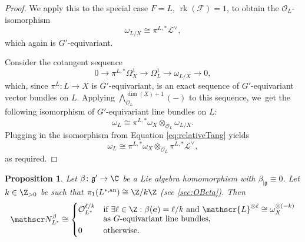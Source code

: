 \documentclass[JEP,XML,SOM,Unicode,published]{cedram}
\newcommand{\bme}{{\boldsymbol{e}}}
\newtheorem{prop}[thm]{Proposition}
\newcommand{\Ell}{\mathscr{L}}
\newcommand{\cO}{\mathcal{O}}\let\O\cO
\newcommand{\frg}{\mathfrak{g}}
\DeclareMathOperator{\rk}{rk}
\newcommand\restr[2]{{#1_{| {#2}}}}
\begin{document}
\begin{proof}
We apply this to the special case $F=L$, \ie $\rk(\mathscr{F})=1$, to obtain the $\cO_L$\nobreakdash-isomorphism
\begin{equation}\label{eq:relativeTang}
\omega_{L/X}\cong \pi^{L,*}\Ell^\vee,
\end{equation}which again is $G'$-equivariant.

Consider the cotangent sequence
\[
0 \to \pi^{L,*} \Omega^1_X \to \Omega^1_L
\to \omega_{L/X}\to 0,
\]
which, since $\pi^L \colon L\to X$ is $G'$-equivariant, is an exact sequence of $G'$-equivariant vector bundles on $L$. Applying $\bigwedge^{\dim(X)+1}_{\cO_L}(-)$ to this sequence, we~get the following isomorphism of $G'$-equivariant line bundles on $L$:
\[
\omega_L \cong \pi^{L,*}\omega_X \otimes_{\cO_L} \omega_{L/X}.
\]
Plugging in the isomorphism from Equation \eqref{eq:relativeTang} yields
\[
\omega_L \cong \pi^{L,*} \omega_X \otimes_{\O_L} \pi^{L,*} \Ell^\vee,
\]
as required.
\end{proof}

\begin{prop} \label{prop:NBetaEqualsOBeta}
Let
$\beta \colon \frg' \to \C$ be a Lie algebra homomorphism with $\restr{\beta}{\frg} \equiv 0$. Let $k \in \Z_{>0}$ be such that $\pi_1(L^{*,\mathrm{an}}) \cong \Z/k\Z$ (see \cref{sec:OBeta}). Then
\[
\mathscr N_{L^*}^\beta \cong 
\begin{cases}
\O_{L^*}^{\ell/k} &\text{if $\exists \ell \in \Z: \beta(\bme) = \ell/k$ and $\Ell^{\otimes \ell} \cong \omega_X^{\otimes (-k)}$} \\[-3pt]
& \text{as $G$-equivariant line bundles,} \\
0 & \text{otherwise.}
\end{cases}
\]
\end{prop}
\end{document}
